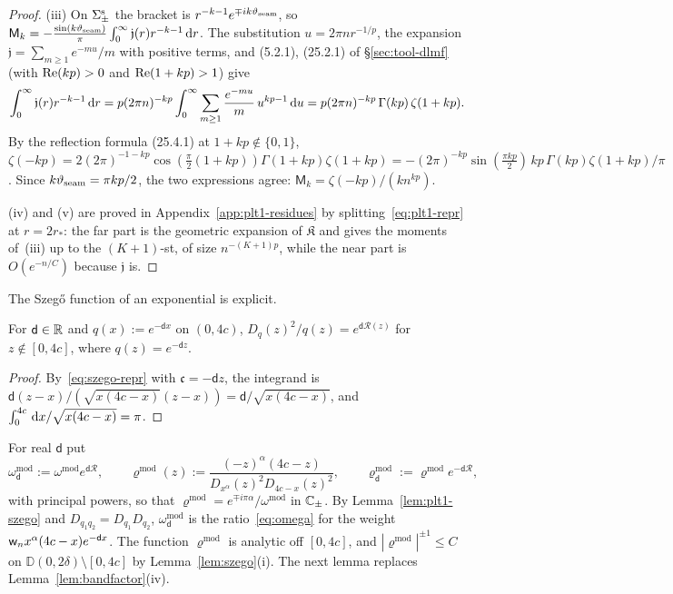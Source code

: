 \begin{proof}
(iii) On $\Sigma^{\mathrm{s}}_\pm$ the bracket is $r^{-k-1}e^{\mp ik\vartheta_{\mathrm{seam}}}$, so
$\mathsf M_k=-\frac{\sin(k\vartheta_{\mathrm{seam}})}\pi\int_0^\infty\mathfrak j(r)r^{-k-1}\,\mathrm{d} r$. The substitution $u=2\pi nr^{-1/p}$,
the expansion $\mathfrak j=\sum_{m\ge1}e^{-mu}/m$ with positive terms, and (5.2.1), (25.2.1) of \S\ref{sec:tool-dlmf}
(with $\operatorname{Re}(kp)>0$ and $\operatorname{Re}(1+kp)>1$) give
\[
  \int_0^\infty\mathfrak j(r)r^{-k-1}\,\mathrm{d} r=p(2\pi n)^{-kp}\int_0^\infty\sum_{m\ge1}\frac{e^{-mu}}m\,u^{kp-1}\,\mathrm{d} u
  =p(2\pi n)^{-kp}\,\Gamma(kp)\,\zeta(1+kp).
\]
By the reflection formula (25.4.1) at $1+kp\notin\{0,1\}$,
$\zeta(-kp)=2(2\pi)^{-1-kp}\cos(\frac\pi2(1+kp))\Gamma(1+kp)\zeta(1+kp)=-(2\pi)^{-kp}\sin(\frac{\pi kp}2)\,kp\,\Gamma(kp)\zeta(1+kp)/\pi$.
Since $k\vartheta_{\mathrm{seam}}=\pi kp/2$, the two expressions agree: $\mathsf M_k=\zeta(-kp)/(kn^{kp})$.

(iv) and (v) are proved in Appendix~\ref{app:plt1-residues} by splitting~\eqref{eq:plt1-repr} at $r=2r_*$: the far
part is the geometric expansion of $\mathfrak K$ and gives the moments of~(iii) up to the $(K+1)$-st, of size $n^{-(K+1)p}$,
while the near part is $O(e^{-n/C})$ because $\mathfrak j$ is.
\end{proof}

The Szeg\H{o} function of an exponential is explicit.

\begin{lemma}\label{lem:plt1-szego}
For $\mathsf d\in\mathbb{R}$ and $q(x):=e^{-\mathsf dx}$ on $(0,4c)$, $D_q(z)^2/q(z)=e^{\mathsf d\mathcal R(z)}$ for $z\notin[0,4c]$,
where $q(z)=e^{-\mathsf dz}$.
\end{lemma}

\begin{proof}
By~\eqref{eq:szego-repr} with $\mathfrak c=-\mathsf dz$, the integrand is
$\mathsf d(z-x)/(\sqrt{x(4c-x)}(z-x))=\mathsf d/\sqrt{x(4c-x)}$, and $\int_0^{4c}\,\mathrm{d} x/\sqrt{x(4c-x)}=\pi$.
\end{proof}

For real $\mathsf d$ put
\begin{equation}\label{eq:plt1-omega-d}
  \omega^{\mathrm{mod}}_{\mathsf d}:=\omega^{\mathrm{mod}}e^{\mathsf d\mathcal R},\qquad
  \varrho^{\mathrm{mod}}(z):=\frac{(-z)^\alpha(4c-z)}{D_{x^\alpha}(z)^2D_{4c-x}(z)^2},\qquad
  \varrho^{\mathrm{mod}}_{\mathsf d}:=\varrho^{\mathrm{mod}}e^{-\mathsf d\mathcal R},
\end{equation}
with principal powers, so that $\varrho^{\mathrm{mod}}=e^{\mp i\pi\alpha}/\omega^{\mathrm{mod}}$ in $\mathbb{C}_\pm$. By
Lemma~\ref{lem:plt1-szego} and $D_{q_1q_2}=D_{q_1}D_{q_2}$, $\omega^{\mathrm{mod}}_{\mathsf d}$ is the ratio~\eqref{eq:omega}
for the weight $\mathsf w_n x^\alpha(4c-x)e^{-\mathsf dx}$. The function $\varrho^{\mathrm{mod}}$ is analytic off $[0,4c]$, and
$|\varrho^{\mathrm{mod}}|^{\pm1}\le C$ on $\mathbb D(0,2\delta)\setminus[0,4c]$ by Lemma~\ref{lem:szego}(i). The next lemma
replaces Lemma~\ref{lem:bandfactor}(iv).

